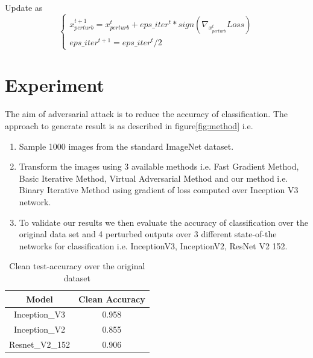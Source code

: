 \documentclass[letterpaper]{article} %
\begin{document}
Update as
\begin{equation}
\begin{cases}
x_{perturb}^{t+1} = x_{perturb}^{t} + eps\_iter^{t}* sign ( {\nabla_{x_{perturb}^{t}} Loss} )\\
eps\_iter^{t+1}= eps\_iter^{t}/2
   \end{cases}
   \label{eqn:}
\end{equation}



\section{Experiment}

The aim of adversarial attack is to reduce the accuracy of classification.
The approach to generate result is as described in figure\ref{fig:method} i.e.
\begin{enumerate}
\item Sample 1000  images  from  the  standard  ImageNet dataset.
\item Transform the images using 3 available methods i.e.  Fast Gradient Method, Basic Iterative Method, Virtual Adversarial Method and our method i.e.  Binary Iterative Method using gradient of loss computed over Inception V3 network.
\item To validate our results we then evaluate the accuracy of classification over the original data set and 4 perturbed outputs over 3 different state-of-the networks for classification i.e. InceptionV3, InceptionV2, ResNet V2 152.

\end{enumerate}





\begin{table}
  \centering
    \begin{tabular}{|c|c|}
\hline
\textbf{Model} & \textbf{Clean Accuracy} \\
\hline
     Inception\_V3 & 0.958 \\
     \hline
     Inception\_V2 & 0.855 \\
     \hline
     Resnet\_V2\_152 & 0.906 \\
     \hline
\end{tabular}

\caption{Clean test-accuracy over the original dataset}
\end{table}
\end{document}
